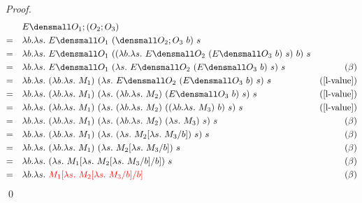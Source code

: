 \begin{theorem}
\begin{proof}
        \begin{align*}
            &\quad E\den{O_1;(O_2;O_3)} \\
            =& \quad \lambda b. \lambda s.~ E\den{O_1} ~(\den{O_2;O_3} ~b) ~s \\
            =& \quad \lambda b. \lambda s.~ E\den{O_1} ~((\lambda b. \lambda s.~ E\den{O_2} ~(E\den{O_3} ~b) ~s) ~b) ~s \\
            =& \quad \lambda b. \lambda s.~ E\den{O_1} ~(\lambda s.~ E\den{O_2} ~(E\den{O_3} ~b) ~s) ~s & (\beta) \\
            =& \quad \lambda b. \lambda s.~ (\lambda b. \lambda s.~ M_1) ~(\lambda s.~ E\den{O_2} ~(E\den{O_3} ~b) ~s) ~s & (\cref{l-value})\\
            =& \quad \lambda b. \lambda s.~ (\lambda b. \lambda s.~ M_1) ~(\lambda s.~ (\lambda b. \lambda s.~ M_2) ~(E\den{O_3} ~b) ~s) ~s & (\cref{l-value})\\
            =& \quad \lambda b. \lambda s.~ (\lambda b. \lambda s.~ M_1) ~(\lambda s.~ (\lambda b. \lambda s.~ M_2) ~((\lambda b. \lambda s.~ M_3) ~b) ~s) ~s & (\cref{l-value})\\
            =& \quad \lambda b. \lambda s.~ (\lambda b. \lambda s.~ M_1) ~(\lambda s.~ (\lambda b. \lambda s.~ M_2) ~(\lambda s.~ M_3) ~s) ~s & (\beta)\\
            =& \quad \lambda b. \lambda s.~ (\lambda b. \lambda s.~ M_1) ~(\lambda s.~ (\lambda s.~ M_2\subst{b}{\lambda s.~ M_3}) ~s) ~s & (\beta)\\
            =& \quad \lambda b. \lambda s.~ (\lambda b. \lambda s.~ M_1) ~(\lambda s.~ M_2\subst{b}{\lambda s.~ M_3}) ~s & (\beta)\\
            =& \quad \lambda b. \lambda s.~ (\lambda s.~ M_1\subst{b}{\lambda s.~ M_2\subst{b}{\lambda s.~ M_3}}) ~s & (\beta)\\
            =& \quad \lambda b. \lambda s.~ \color{red}{M_1\subst{b}{\lambda s.~ M_2\subst{b}{\lambda s.~ M_3}}} & (\beta)
        \end{align*}
        \qed
    \end{proof}
\end{theorem}

